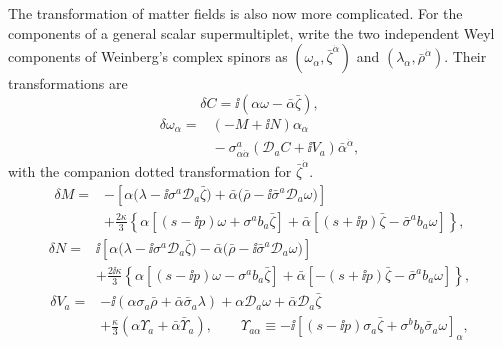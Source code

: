 The transformation of matter fields is also now more complicated. For
the components of a general scalar supermultiplet, write the two independent
Weyl components of Weinberg's complex spinors as
\((\omega_\alpha,\bar\zeta^{\dot\alpha})\) and
\((\lambda_\alpha,\bar\rho^{\dot\alpha})\).  Their transformations are
\begin{equation}
  \delta C=\ii\left(\alpha\omega-\bar\alpha\bar\zeta\right),
  \tag{31.6.12}\label{eq:31.6.12}
\end{equation}
\begin{equation}
  \begin{aligned}
  \delta\omega_\alpha
  ={}&(-M+\ii N)\alpha_\alpha\\
  &{}
   -\sigma^a_{\alpha\dot\alpha}
     (\mathcal D_aC+\ii V_a)\bar\alpha^{\dot\alpha},
  \end{aligned}
  \tag{31.6.13}\label{eq:31.6.13}
\end{equation}
with the companion dotted transformation for \(\bar\zeta^{\dot\alpha}\).
\begin{equation}
  \begin{aligned}
  \delta M
  ={}&-\left[
    \alpha\bigl(\lambda-\ii\sigma^a\mathcal D_a\bar\zeta\bigr)
    +\bar\alpha\bigl(
      \bar\rho-\ii\bar\sigma^a\mathcal D_a\omega\bigr)
  \right]\\
  &+\frac{2\kappa}{3}\left\{
    \alpha\left[(s-\ii p)\omega+\sigma^ab_a\bar\zeta\right]
    +\bar\alpha\left[
      (s+\ii p)\bar\zeta-\bar\sigma^ab_a\omega\right]
  \right\},
  \end{aligned}
  \tag{31.6.14}\label{eq:31.6.14}
\end{equation}
\begin{equation}
  \begin{aligned}
  \delta N
  ={}&\ii\left[
    \alpha\bigl(\lambda-\ii\sigma^a\mathcal D_a\bar\zeta\bigr)
    -\bar\alpha\bigl(
      \bar\rho-\ii\bar\sigma^a\mathcal D_a\omega\bigr)
  \right]\\
  &+\frac{2\ii\kappa}{3}\left\{
    \alpha\left[(s-\ii p)\omega-\sigma^ab_a\bar\zeta\right]
    +\bar\alpha\left[
      -(s+\ii p)\bar\zeta-\bar\sigma^ab_a\omega\right]
  \right\},
  \end{aligned}
  \tag{31.6.15}\label{eq:31.6.15}
\end{equation}
\begin{equation}
  \begin{aligned}
  \delta V_a
  ={}&-\ii\left(
    \alpha\sigma_a\bar\rho
    +\bar\alpha\bar\sigma_a\lambda\right)
   +\alpha\mathcal D_a\omega
   +\bar\alpha\mathcal D_a\bar\zeta\\
  &+\frac{\kappa}{3}
   \left(\alpha\Upsilon_a+\bar\alpha\bar\Upsilon_a\right),
  \qquad
  \Upsilon_{a\alpha}
  \equiv-\ii\left[
    (s-\ii p)\sigma_a\bar\zeta
    +\sigma^bb_b\bar\sigma_a\omega\right]_\alpha,
  \end{aligned}
  \tag{31.6.16}\label{eq:31.6.16}
\end{equation}
